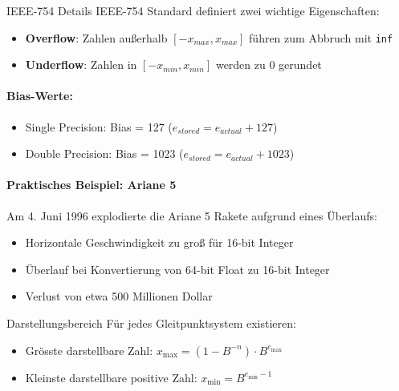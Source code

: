 \begin{example2}{IEEE-754 Details}
IEEE-754 Standard definiert zwei wichtige Eigenschaften:
\begin{itemize}
    \item \textbf{Overflow}: Zahlen außerhalb $[-x_{max}, x_{max}]$ führen zum Abbruch mit \texttt{inf}
    \item \textbf{Underflow}: Zahlen in $[-x_{min}, x_{min}]$ werden zu 0 gerundet
\end{itemize}

\paragraph{Bias-Werte:}
\begin{itemize}
    \item Single Precision: Bias = 127 ($e_{stored} = e_{actual} + 127$)
    \item Double Precision: Bias = 1023 ($e_{stored} = e_{actual} + 1023$)
\end{itemize}

\paragraph{Praktisches Beispiel: Ariane 5}
Am 4. Juni 1996 explodierte die Ariane 5 Rakete aufgrund eines Überlaufs:
\begin{itemize}
    \item Horizontale Geschwindigkeit zu groß für 16-bit Integer
    \item Überlauf bei Konvertierung von 64-bit Float zu 16-bit Integer
    \item Verlust von etwa 500 Millionen Dollar
\end{itemize}
\end{example2}

\begin{theorem}{Darstellungsbereich}
Für jedes Gleitpunktsystem existieren:
\begin{itemize}
    \item Grösste darstellbare Zahl: \large{$x_{\text{max}} = (1-B^{-n}) \cdot B^{e_{\text{max}}}$}
    \item \normalsize{Kleinste darstellbare positive Zahl:} \large{$x_{\text{min}} = B^{e_{\text{min}}-1}$}
\end{itemize}
\end{theorem}

